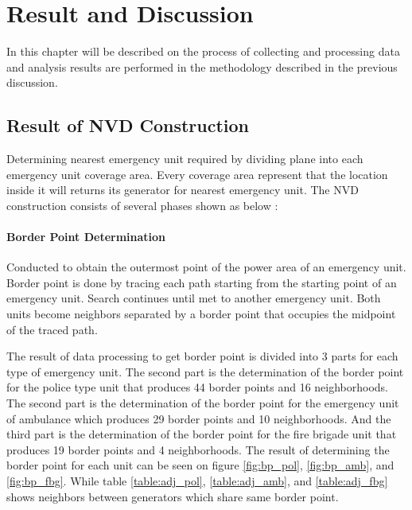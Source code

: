 \chapter{Result and Discussion}
In this chapter will be described on the process of collecting and processing data and analysis results are performed in the methodology described in the previous discussion.

\section{Result of NVD Construction}
Determining nearest emergency unit required by dividing plane into each emergency unit coverage area. Every coverage area represent that the location inside it will returns its generator for nearest emergency unit. The NVD construction consists of several phases shown as below :

\subsubsection{Border Point Determination}
Conducted to obtain the outermost point of the power area of an emergency unit. Border point is done by tracing each path starting from the starting point of an emergency unit. Search continues until met to another emergency unit. Both units become neighbors separated by a border point that occupies the midpoint of the traced path.

The result of data processing to get border point is divided into 3 parts for each type of emergency unit. The second part is the determination of the border point for the police type unit that produces 44 border points and 16 neighborhoods. The second part is the determination of the border point for the emergency unit of ambulance which produces 29 border points and 10 neighborhoods. And the third part is the determination of the border point for the fire brigade unit that produces 19 border points and 4 neighborhoods. The result of determining the border point for each unit can be seen on figure \ref{fig:bp_pol}, \ref{fig:bp_amb}, and \ref{fig:bp_fbg}. While table \ref{table:adj_pol}, \ref{table:adj_amb}, and \ref{table:adj_fbg} shows neighbors between generators which share same border point.

